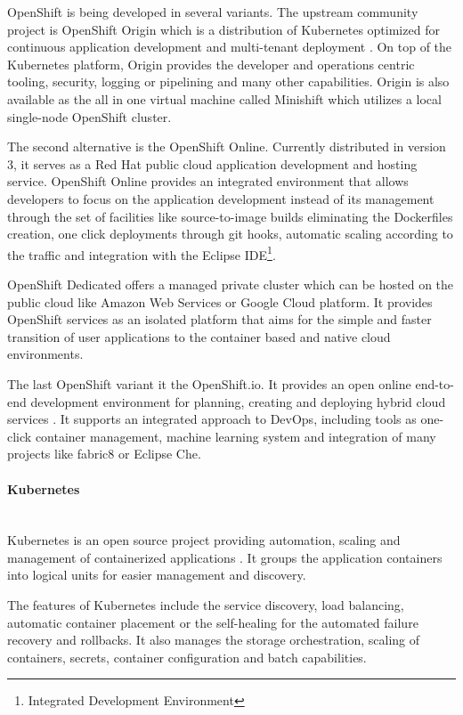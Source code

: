 \documentclass[oneside,
  digital, %
  table,   %
  nolof,     %
  nolot,     %
]{fithesis3}
\newcommand{\newlinepar}[1]{\paragraph{#1}\needspace{4\baselineskip}\mbox{}\\}
\begin{document}
OpenShift is being developed in several variants. The upstream community project is OpenShift Origin which is a distribution of Kubernetes optimized for continuous application development and multi-tenant deployment \cite{openshift}. On top of the Kubernetes platform, Origin provides the developer and operations centric tooling, security, logging or pipelining and many other capabilities. Origin is also available as the all in one virtual machine called Minishift which utilizes a local single-node OpenShift cluster. 

The second alternative is the OpenShift Online. Currently distributed in version 3, it serves as a Red Hat public cloud application development and hosting service. OpenShift Online provides an integrated environment that allows developers to focus on the application development instead of its management through the set of facilities like source-to-image builds eliminating the Dockerfiles creation, one click deployments through git hooks, automatic scaling according to the traffic and integration with the Eclipse IDE\footnote{Integrated Development Environment}.

OpenShift Dedicated offers a managed private cluster which can be hosted on the public cloud like Amazon Web Services or Google Cloud platform. It provides OpenShift services as an isolated platform that aims for the simple and faster transition of user applications to the container based and native cloud environments.

The last OpenShift variant it the OpenShift.io. It provides an open online end-to-end development environment for planning, creating and deploying hybrid cloud services \cite{openshift_io}. It supports an integrated approach to DevOps, including tools as one-click container management, machine learning system and integration of many projects like fabric8 or Eclipse Che.

\newlinepar{Kubernetes}

Kubernetes is an open source project providing automation, scaling and management of containerized applications \cite{kubernetes}. It groups the application containers into logical units for easier management and discovery.

The features of Kubernetes include the service discovery, load balancing, automatic container placement or the self-healing for the automated failure recovery and rollbacks. It also manages the storage orchestration, scaling of containers, secrets, container configuration and batch capabilities.
\end{document}
